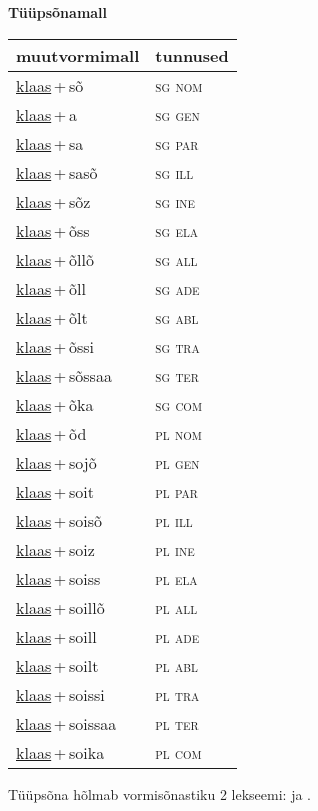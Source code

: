 
\vspace{1.8em}
\begin{minipage}{\textwidth}
\textbf{Tüüpsõnamall \,}\\

\begin{sideways}
\begin{tabular}{l l}
muutvormimall & tunnused \\
\hline
\underline{klaas}\,+\,sõ & \textsc{ sg nom } \\
\underline{klaas}\,+\,a & \textsc{ sg gen } \\
\underline{klaas}\,+\,sa & \textsc{ sg par } \\
\underline{klaas}\,+\,sasõ & \textsc{ sg ill } \\
\underline{klaas}\,+\,sõz & \textsc{ sg ine } \\
\underline{klaas}\,+\,õss & \textsc{ sg ela } \\
\underline{klaas}\,+\,õllõ & \textsc{ sg all } \\
\underline{klaas}\,+\,õll & \textsc{ sg ade } \\
\underline{klaas}\,+\,õlt & \textsc{ sg abl } \\
\underline{klaas}\,+\,õssi & \textsc{ sg tra } \\
\underline{klaas}\,+\,sõssaa & \textsc{ sg ter } \\
\underline{klaas}\,+\,õka & \textsc{ sg com } \\
\underline{klaas}\,+\,õd & \textsc{ pl nom } \\
\underline{klaas}\,+\,sojõ & \textsc{ pl gen } \\
\underline{klaas}\,+\,soit & \textsc{ pl par } \\
\underline{klaas}\,+\,soisõ & \textsc{ pl ill } \\
\underline{klaas}\,+\,soiz & \textsc{ pl ine } \\
\underline{klaas}\,+\,soiss & \textsc{ pl ela } \\
\underline{klaas}\,+\,soillõ & \textsc{ pl all } \\
\underline{klaas}\,+\,soill & \textsc{ pl ade } \\
\underline{klaas}\,+\,soilt & \textsc{ pl abl } \\
\underline{klaas}\,+\,soissi & \textsc{ pl tra } \\
\underline{klaas}\,+\,soissaa & \textsc{ pl ter } \\
\underline{klaas}\,+\,soika & \textsc{ pl com } \\
\end{tabular}
\end{sideways}
\label{tab:tüüpsõnamall-klaassõ}

\end{minipage}

 
\vspace{1em}
\noindent Tüüpsõna hõlmab vormisõnastiku 2 lekseemi:  ja .
